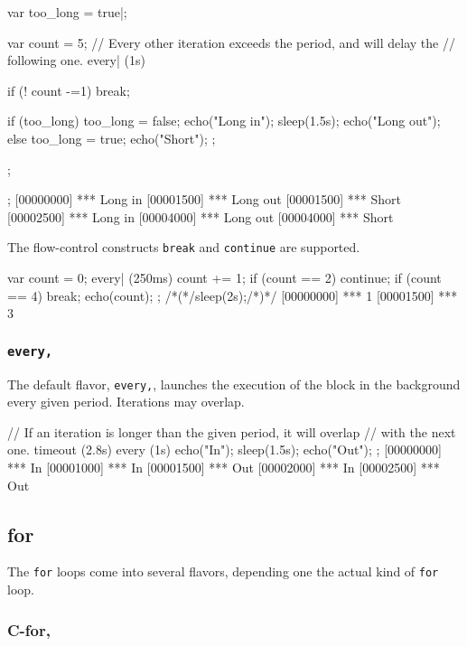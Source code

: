 \begin{urbiscript}
{
  var too_long = true|;

  var count = 5;
  // Every other iteration exceeds the period, and will delay the
  // following one.
  every| (1s)
  {
    if (! count -=1)
      break;

    if (too_long)
    {
      too_long = false;
      echo("Long in");
      sleep(1.5s);
      echo("Long out");
    }
    else
    {
      too_long = true;
      echo("Short");
    };
  };
};
[00000000] *** Long in
[00001500] *** Long out
[00001500] *** Short
[00002500] *** Long in
[00004000] *** Long out
[00004000] *** Short
\end{urbiscript}

The flow-control constructs \lstinline|break| and \lstinline|continue|
are supported.

\begin{urbiscript}
{
  var count = 0;
  every| (250ms)
  {
    count += 1;
    if (count == 2)
      continue;
    if (count == 4)
      break;
    echo(count);
  }
};
/*(*/sleep(2s);/*)*/
[00000000] *** 1
[00001500] *** 3
\end{urbiscript}



\subsubsection{\lstinline'every,'}
The default flavor, \lstinline|every,|, launches the execution of the
block in the background every given period. Iterations may overlap.

\begin{urbiscript}[firstnumber=1]
// If an iteration is longer than the given period, it will overlap
// with the next one.
timeout (2.8s)
  every (1s)
  {
    echo("In");
    sleep(1.5s);
    echo("Out");
  };
[00000000] *** In
[00001000] *** In
[00001500] *** Out
[00002000] *** In
[00002500] *** Out
\end{urbiscript}

\subsection{for}

The \lstinline|for| loops come into several flavors, depending one the
actual kind of \lstinline|for| loop.

\subsubsection{C-for,}
\experimentalremoved{}

